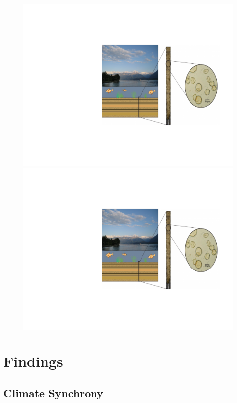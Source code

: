 \documentclass{beamer}
\begin{document}
\begin{frame}
{\begin{figure}
\includegraphics[width=.5\linewidth]{cores.pdf}
\includegraphics[width=.5\linewidth]{cores.pdf}
\end{figure}}




\end{frame}




\section{Findings}
\subsection{Climate Synchrony}
\end{document}
